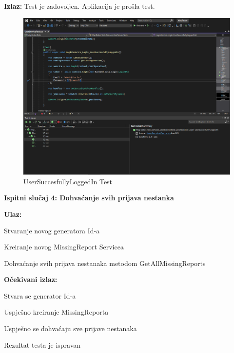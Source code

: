 			\noindent \textbf{Izlaz:} Test je zadovoljen. Aplikacija je prošla test.
			
			\begin{figure}[H] \includegraphics[width=\linewidth]{./slike/Testovi/Unit/UnitTest_3.png}
				\caption{UserSuccesfullyLoggedIn Test}
			\end{figure}
			
			\eject
			
			\noindent \textbf{Ispitni slučaj 4: Dohvaćanje svih prijava nestanka}
			
			\noindent \textbf{Ulaz:}
			
			\begin{packed_enum}
				
				\item Stvaranje novog generatora Id-a
				\item Kreiranje novog MissingReport Servicea
				\item Dohvaćanje svih prijava nestanaka metodom GetAllMissingReports
				
			\end{packed_enum}
			
			\noindent \textbf{Očekivani izlaz:}
			
			\begin{packed_enum}
				
				\item Stvara se generator Id-a
				\item Uspješno kreiranje MissingReporta
				\item Uspješno se dohvaćaju sve prijave nestanaka
				\item Rezultat testa je ispravan
				
			\end{packed_enum}
			
